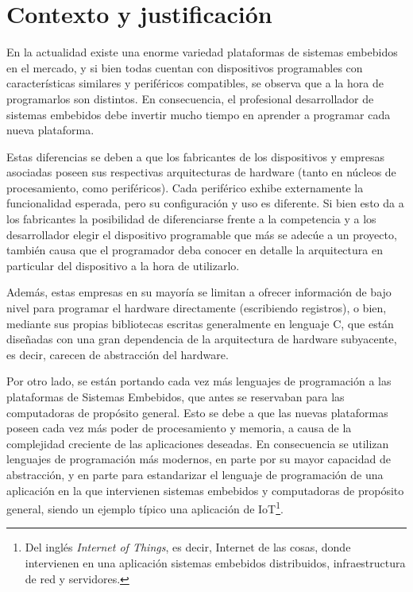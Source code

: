 \section{Contexto y justificación}
\label{sec:contextoYJustificacion}

En la actualidad existe una enorme variedad plataformas de sistemas embebidos en el mercado, y si bien todas cuentan con dispositivos programables con características similares y periféricos compatibles, se observa que a la hora de programarlos son distintos. En consecuencia, el profesional desarrollador de sistemas embebidos debe invertir mucho tiempo en aprender a programar cada nueva plataforma.

Estas diferencias se deben a que los fabricantes de los dispositivos y empresas asociadas poseen sus respectivas arquitecturas de hardware (tanto en núcleos de procesamiento, como periféricos). Cada periférico exhibe externamente la funcionalidad esperada, pero su configuración y uso es diferente. Si bien esto da a los fabricantes la posibilidad de diferenciarse frente a la competencia y a los desarrollador elegir el dispositivo programable que más se adecúe a un proyecto, también causa que el programador deba conocer en detalle la arquitectura en particular del dispositivo a la hora de utilizarlo.

Además, estas empresas en su mayoría se limitan a ofrecer información de bajo nivel para programar el hardware directamente (escribiendo registros), o bien, mediante sus propias bibliotecas escritas generalmente en lenguaje C, que están diseñadas con una gran dependencia de la arquitectura de hardware subyacente, es decir, carecen de abstracción del hardware.

Por otro lado, se están portando cada vez más lenguajes de programación a las plataformas de Sistemas Embebidos, que antes se reservaban para las computadoras de propósito general. Esto se debe a que las nuevas plataformas poseen cada vez más poder de procesamiento y memoria, a causa de la complejidad creciente de las aplicaciones deseadas. En consecuencia se utilizan lenguajes de programación más modernos, en parte por su mayor capacidad de abstracción, y en parte para estandarizar el lenguaje de programación de una aplicación en la que intervienen sistemas embebidos y computadoras de propósito general, siendo un ejemplo típico una aplicación de IoT\footnote{Del inglés \emph{Internet of Things}, es decir, Internet de las cosas, donde intervienen en una aplicación sistemas embebidos distribuidos, infraestructura de red y servidores.}.

